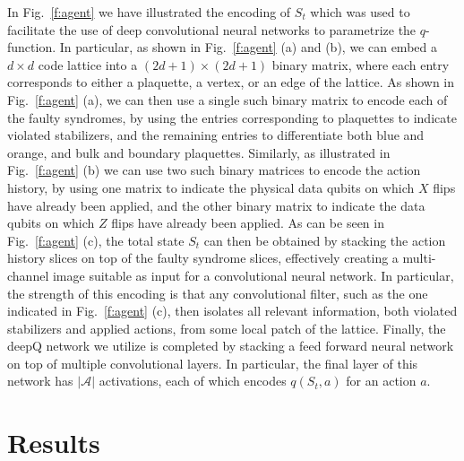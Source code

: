\documentclass[twocolumn,preprintnumbers,amsmath,amssymb,notitlepage,nofootinbib,longbibliography,superscriptaddress,aps,pra,10pt]{revtex4-1}
\begin{document}
	In Fig.~\ref{f:agent} we have illustrated the encoding of $S_t$ which was used to facilitate the use of deep convolutional neural networks to parametrize the $q$-function.
	In particular, as shown in Fig.~\ref{f:agent} (a) and (b), we can embed a $d\times d$ code lattice into a $(2d + 1)\times(2d+1)$ binary matrix, where each entry corresponds to either a plaquette, a vertex, or an edge of the lattice.
	As shown in Fig.~\ref{f:agent} (a), we can then use a single such binary matrix to encode each of the faulty syndromes, by using the entries corresponding to plaquettes to indicate violated stabilizers, and the remaining entries to differentiate both blue and orange, and bulk and boundary plaquettes.
	Similarly, as illustrated in  Fig.~\ref{f:agent} (b) we can use two such binary matrices to encode the action history, by using one matrix to indicate the physical data qubits on which $X$ flips have already been applied, and the other binary matrix to indicate the data qubits on which $Z$ flips have already been applied.
	As can be seen in Fig.~\ref{f:agent} (c), the total state $S_t$ can then be obtained by stacking the action history slices on top of the faulty syndrome slices, effectively creating a multi-channel image suitable as input for a convolutional neural network.
	In particular, the strength of this encoding is that any convolutional filter, such as the one indicated in Fig.~\ref{f:agent} (c), then isolates all relevant information, both violated stabilizers and applied actions, from some local patch of the lattice.
	Finally, the deepQ network we utilize is completed by stacking a feed forward neural network on top of multiple convolutional layers.
	In particular, the final layer of this network has $|\mathcal{A}|$ activations, each of which encodes $q(S_t,a)$ for an action $a$.

\section{Results}\label{s:results}
\end{document}

